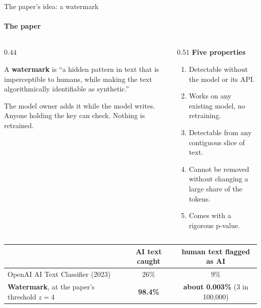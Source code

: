 \documentclass[aspectratio=169,10pt,t]{beamer}
\newcommand{\key}[1]{\textcolor{calblue}{\textbf{#1}}}
\begin{document}
\begin{frame}{The paper's idea: a watermark}
  \framesubtitle{The paper}
  \begin{columns}[T,onlytextwidth]
    \begin{column}{0.44\textwidth}
      \raggedright
      \begin{goldbox}
        \raggedright A \key{watermark} is ``a hidden pattern in text that is imperceptible to humans, while making the text algorithmically identifiable as synthetic.''
      \end{goldbox}
      \vspace{0.4em}
      The model owner adds it while the model writes. Anyone holding the key can check. Nothing is retrained.
    \end{column}
    \begin{column}{0.51\textwidth}
      \key{Five properties}
      \begin{enumerate}
        \item Detectable without the model or its API.
        \item Works on any existing model, no retraining.
        \item Detectable from any contiguous slice of text.
        \item Cannot be removed without changing a large share of the tokens.
        \item Comes with a rigorous p-value.
      \end{enumerate}
    \end{column}
  \end{columns}
  \vspace{0.7em}
  \begin{center}
  \small
  \begin{tabular}{@{}lcc@{}}
    \toprule
     & AI text caught & human text flagged as AI \\
    \midrule
    OpenAI AI Text Classifier (2023) & 26\% & 9\% \\
    \key{Watermark}, at the paper's threshold $z = 4$ & \key{98.4\%} & \key{about 0.003\%} (3 in 100{,}000) \\
    \bottomrule
  \end{tabular}
  \end{center}
\end{frame}
\end{document}

